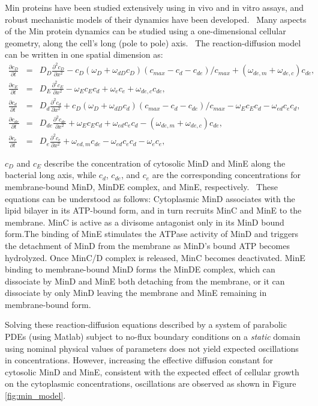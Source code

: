 Min proteins have been studied extensively using in vivo and in vitro assays, and robust mechanistic models of their dynamics have been developed.~\cite{Bonny2013} Many aspects of the Min protein dynamics can be studied using a one-dimensional cellular geometry, along the cell’s long (pole to pole) axis.~\cite{Bonny2013} The reaction-diffusion model can be written in one spatial dimension as:
\begin{eqnarray}
\frac{\partial c_D}{\partial t} & = & D_D \frac{\partial^2 c_D}{\partial x^2} - c_D (\omega_D + \omega_{dD} c_D) (c_{max} - c_d - c_{de})/c_{max} + (\omega_{de, m} + \omega_{de, c}) c_{de}, \\
\frac{\partial c_E}{\partial t} & = & D_E \frac{\partial^2 c_E}{\partial x^2} - \omega_E c_E c_d + \omega_e c_e + \omega_{de, c}  c_{de}, \\
\frac{\partial c_d}{\partial t} & = & D_d \frac{\partial^2 c_d}{\partial x^2} + c_D (\omega_D + \omega_{dD} c_d) (c_{max} - c_d - c_{de})/c_{max} - \omega_E c_E c_d - \omega_{ed} c_e c_d, \\
\frac{\partial c_{de}}{\partial t} & = & D_{de} \frac{\partial^2 c_{de}}{\partial x^2} + \omega_E c_E c_d+ \omega_{ed} c_e c_d -(\omega_{de, m} + \omega_{de, c}) c_{de}, \\
\frac{\partial c_e}{\partial t} & = & D_e \frac{\partial^2 c_e}{\partial x^2} + \omega_{ed,m} c_{de} - \omega_{ed} c_e c_d - \omega_e c_e, 
\end{eqnarray}

\noindent
$c_D$  and $c_E$ describe the concentration of cytosolic MinD and MinE along the bacterial long axis, while $c_d$, $c_{de}$, and $c_e$ are the corresponding concentrations for membrane-bound MinD, MinDE complex, and MinE, respectively.~\cite{Bonny2013} These equations can be understood as follows: Cytoplasmic MinD associates with the lipid bilayer in its ATP-bound form, and in turn recruits MinC and MinE to the membrane. MinC is active as a divisome antagonist only in its MinD bound form.The binding of MinE stimulates the ATPase activity of MinD and triggers the detachment of MinD from the membrane as MinD’s bound ATP becomes hydrolyzed. Once MinC/D complex is released, MinC becomes deactivated. MinE binding to membrane-bound MinD forms the MinDE complex, which can dissociate by MinD and MinE both detaching from the membrane, or it can dissociate by only MinD leaving the membrane and MinE remaining in membrane-bound form. 

Solving these reaction-diffusion equations described by a system of parabolic PDEs (using Matlab) subject to no-flux boundary conditions on a {\it static} domain using nominal physical values of parameters does not yield expected oscillations in concentrations.  However, increasing the effective diffusion constant for cytosolic MinD and MinE, consistent with the expected effect of cellular growth on the cytoplasmic concentrations, oscillations are observed as shown in Figure \ref{fig:min_model}. 